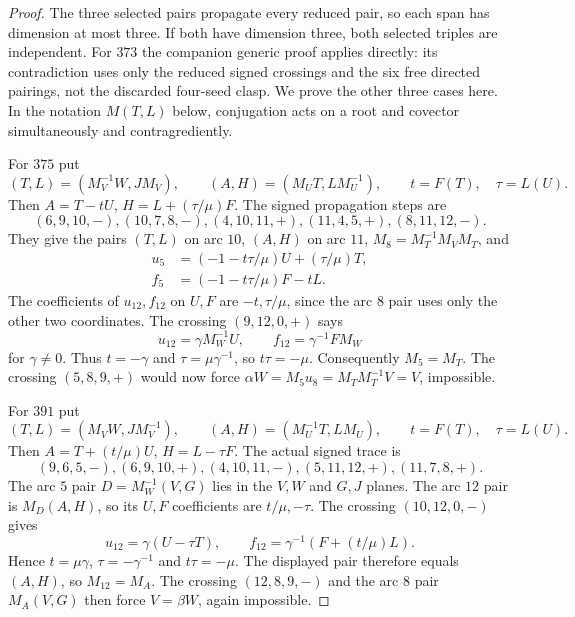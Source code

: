 \documentclass[11pt]{article}
\begin{document}
\begin{proof}
The three selected pairs propagate every reduced pair, so each span
has dimension at most three. If both have dimension three, both selected
triples are independent. For $373$ the companion generic proof applies
directly: its contradiction uses only the reduced signed crossings and
the six free directed pairings, not the discarded four-seed clasp.
We prove the other three cases here. In the notation $M(T,L)$ below,
conjugation acts on a root and covector simultaneously and contragrediently.

For $375$ put
\[
 (T,L)=(M_V^{-1}W,JM_V),\qquad
 (A,H)=(M_UT,LM_U^{-1}),\qquad t=F(T),\quad\tau=L(U).
\]
Then $A=T-tU$, $H=L+(\tau/\mu)F$.
The signed propagation steps are
\[
 (6,9,10,-),(10,7,8,-),(4,10,11,+),
 (11,4,5,+),(8,11,12,-).
\]
They give the pairs $(T,L)$ on arc $10$, $(A,H)$ on arc $11$,
$M_8=M_T^{-1}M_VM_T$, and
\[
\begin{split}
 u_5&=(-1-t\tau/\mu)U+(\tau/\mu)T,\\
 f_5&=(-1-t\tau/\mu)F-tL.
\end{split}
\]
The coefficients of $u_{12},f_{12}$ on $U,F$ are $-t,\tau/\mu$,
since the arc $8$ pair uses only the other two coordinates.
The crossing $(9,12,0,+)$ says
\[
 u_{12}=\gamma M_W^{-1}U,\qquad
 f_{12}=\gamma^{-1}FM_W
\]
for $\gamma\ne0$. Thus $t=-\gamma$ and
$\tau=\mu\gamma^{-1}$, so $t\tau=-\mu$.
Consequently $M_5=M_T$.
The crossing $(5,8,9,+)$ would now force
$\alpha W=M_5u_8=M_TM_T^{-1}V=V$, impossible.

For $391$ put
\[
 (T,L)=(M_VW,JM_V^{-1}),\qquad
 (A,H)=(M_U^{-1}T,LM_U),\qquad t=F(T),\quad\tau=L(U).
\]
Then $A=T+(t/\mu)U$, $H=L-\tau F$.
The actual signed trace is
\[
 (9,6,5,-),(6,9,10,+),(4,10,11,-),
 (5,11,12,+),(11,7,8,+).
\]
The arc $5$ pair $D=M_W^{-1}(V,G)$ lies in the $V,W$ and $G,J$
planes. The arc $12$ pair is $M_D(A,H)$, so its $U,F$ coefficients
are $t/\mu,-\tau$. The crossing $(10,12,0,-)$ gives
\[
 u_{12}=\gamma(U-\tau T),\qquad
 f_{12}=\gamma^{-1}(F+(t/\mu)L).
\]
Hence $t=\mu\gamma$, $\tau=-\gamma^{-1}$ and $t\tau=-\mu$.
The displayed pair therefore equals $(A,H)$, so $M_{12}=M_A$.
The crossing $(12,8,9,-)$ and the arc $8$ pair $M_A(V,G)$ then
force $V=\beta W$, again impossible.


\end{proof}
\end{document}
